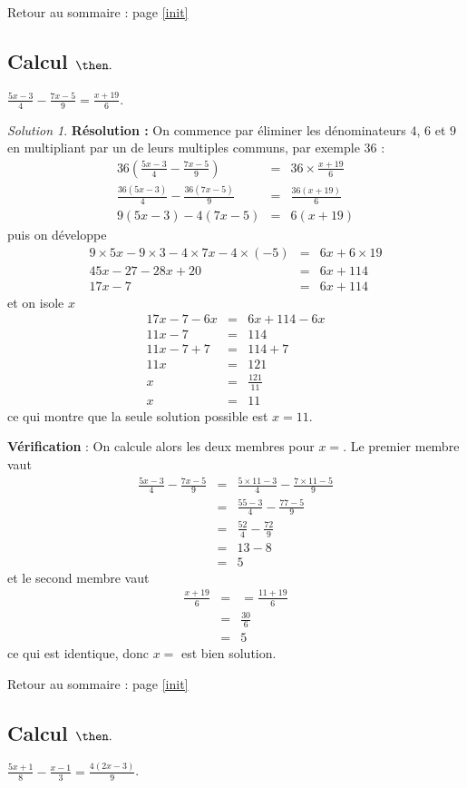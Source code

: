 \documentclass[14pt]{article}
\theoremstyle{remark}
\newtheorem*{sol}{Solution}
\newcounter{n}
\renewcommand{\it}{Retour au sommaire : page \ref{init}
	\subsection{Calcul $ \mathbf{ \then}.$}\label{\then} \stepcounter{n} }
\theoremstyle{plain}
\begin{document}
\it $\frac{5x-3}4 - \frac{7x-5}9 = \frac{x+19}6$. 
\begin{sol}
\textbf{Résolution :} On commence par éliminer les dénominateurs $4$, $6$ et $9$ en multipliant par un de leurs multiples communs, par exemple $36$ : 
\begin{eqnarray*}
36\left(\frac{5x-3}4 - \frac{7x-5}9 \right)
&=& 36\times \frac{x+19}6\\
\frac{36(5x-3)}4 - \frac{36(7x-5)}9 &=& 
\frac{36(x+19)}6 \\
9(5x-3) - 4(7x-5)&=& 6(x+19) 
\end{eqnarray*} puis on développe
\begin{eqnarray*} 
9\times 5x-9\times 3 - 4\times 7x-4\times(-5)&=& 6x+6\times19\\
45x-27-28x+20 &=& 6x+114\\
17x -7 &=& 6x +114  
\end{eqnarray*}et on isole $x$
\begin{eqnarray*}
17x -7 -6x&=& 6x +114 -6x \\
11x-7 &=& 114\\
11x-7+7 &=& 114+7\\
11x &=& 121 \\
x&=& \frac{121}{11} \\
x&=& 11
\end{eqnarray*}
ce qui montre que la seule solution possible est $x=11$. 

\textbf{Vérification} : On calcule alors les deux membres pour $x=$. Le premier membre vaut 
\begin{eqnarray*}\frac{5x-3}4 - \frac{7x-5}9 
&=& \frac{5\times 11-3}4 - \frac{7\times 11-5}9 \\
&=& \frac{55-3}4 - \frac{77-5}9 \\
&=& \frac{52}4 - \frac{72}9 \\
&=& 13 - 8 \\
&=& 5
\end{eqnarray*}
et le second membre vaut 
\begin{eqnarray*}\frac{x+19}6&=&= \frac{11+19}6\\
&=& \frac{30}6\\
&=& 5
\end{eqnarray*} ce qui est identique, donc $x=$ est bien solution.
\end{sol}
\it $\frac{5x+1}8-\frac{x-1}3 = \frac{4(2x-3)}9$. 
\end{document}
